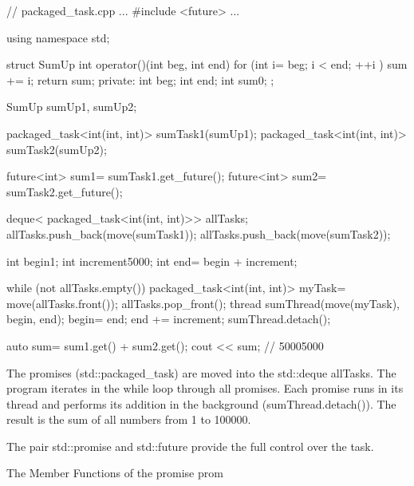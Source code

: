 \begin{cpp}
// packaged_task.cpp
...
#include <future>
...

using namespace std;

struct SumUp{
	int operator()(int beg, int end){
		for (int i= beg; i < end; ++i ) sum += i;
		return sum;
	}
	private:
	int beg;
	int end;
	int sum{0};
};

SumUp sumUp1, sumUp2;

packaged_task<int(int, int)> sumTask1(sumUp1);
packaged_task<int(int, int)> sumTask2(sumUp2);

future<int> sum1= sumTask1.get_future();
future<int> sum2= sumTask2.get_future();

deque< packaged_task<int(int, int)>> allTasks;
allTasks.push_back(move(sumTask1));
allTasks.push_back(move(sumTask2));

int begin{1};
int increment{5000};
int end= begin + increment;

while (not allTasks.empty()){
	packaged_task<int(int, int)> myTask= move(allTasks.front());
	allTasks.pop_front();
	thread sumThread(move(myTask), begin, end);
	begin= end;
	end += increment;
	sumThread.detach();
}

auto sum= sum1.get() + sum2.get();
cout << sum; // 50005000
\end{cpp}

The promises (std::packaged\_task) are moved into the std::deque allTasks. The program iterates in the while loop through all promises. Each promise runs in its thread and performs its addition in the background (sumThread.detach()). The result is the sum of all numbers from 1 to 100000.


The pair std::promise and std::future provide the full control over the task.

\begin{center}
The Member Functions of the promise prom
\end{center}

